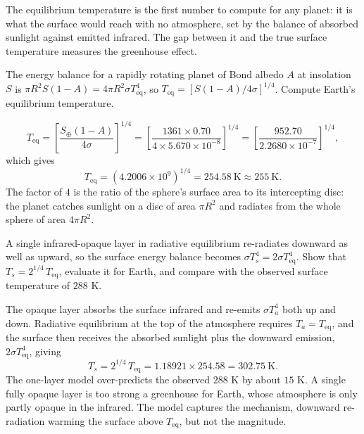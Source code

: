 The equilibrium temperature is the first number to compute for any planet:
it is what the surface would reach with no atmosphere, set by the balance of absorbed sunlight against emitted infrared.
The gap between it and the true surface temperature measures the greenhouse effect.

\parti The energy balance for a rapidly rotating planet of Bond albedo $A$ at insolation $S$ is
$\pi R^2 S(1-A) = 4\pi R^2 \sigma T_\mathrm{eq}^4$,
so $T_\mathrm{eq} = \left[S(1-A)/4\sigma\right]^{1/4}$.
Compute Earth's equilibrium temperature.

\begin{solution}
\[
T_\mathrm{eq} = \left[\frac{S_\oplus(1-A)}{4\sigma}\right]^{1/4}
= \left[\frac{1361 \times 0.70}{4 \times 5.670\times10^{-8}}\right]^{1/4}
= \left[\frac{952.70}{2.2680\times10^{-7}}\right]^{1/4},
\]
which gives
\[
T_\mathrm{eq} = \left(4.2006\times10^{9}\right)^{1/4} = 254.58\ \mathrm{K} \approx 255\ \mathrm{K}.
\]
The factor of $4$ is the ratio of the sphere's surface area to its intercepting disc:
the planet catches sunlight on a disc of area $\pi R^2$ and radiates from the whole sphere of area $4\pi R^2$.
\end{solution}

\parti A single infrared-opaque layer in radiative equilibrium re-radiates downward as well as upward,
so the surface energy balance becomes $\sigma T_s^4 = 2\sigma T_\mathrm{eq}^4$.
Show that $T_s = 2^{1/4}\,T_\mathrm{eq}$, evaluate it for Earth, and compare with the observed surface temperature of $288$ K.

\begin{solution}
The opaque layer absorbs the surface infrared and re-emits $\sigma T_a^4$ both up and down.
Radiative equilibrium at the top of the atmosphere requires $T_a = T_\mathrm{eq}$,
and the surface then receives the absorbed sunlight plus the downward emission, $2\sigma T_\mathrm{eq}^4$, giving
\[
T_s = 2^{1/4}\,T_\mathrm{eq} = 1.18921 \times 254.58 = 302.75\ \mathrm{K}.
\]
The one-layer model over-predicts the observed $288$ K by about $15$ K.
A single fully opaque layer is too strong a greenhouse for Earth, whose atmosphere is only partly opaque in the infrared.
The model captures the mechanism, downward re-radiation warming the surface above $T_\mathrm{eq}$, but not the magnitude.
\end{solution}

